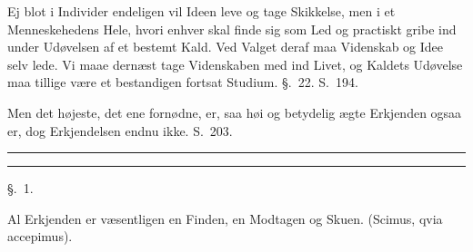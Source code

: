 \documentclass[12pt,a4paper]{book}
\newcommand{\apage}[1]{\marginnote{\footnotesize\textit{[#1]}}}
\begin{document}
Ej blot i Individer endeligen vil Ideen leve og tage Skikkelse, men i et
Menneskehedens Hele, hvori enhver skal finde sig som Led og practiskt gribe
ind under Udøvelsen af et bestemt Kald. Ved Valget deraf maa Videnskab og Idee
selv lede. Vi maae dernæst tage Videnskaben med ind Livet, og Kaldets
Udøvelse maa tillige være et bestandigen fortsat Studium. §.~22. S.~194.

Men det højeste, det ene fornødne, er, saa høi og betydelig ægte Erkjenden
ogsaa er, dog Erkjendelsen endnu ikke. S.~203.

\begin{center}\rule{0.28\linewidth}{0.4pt}\end{center}


\begin{center}\rule{0.28\linewidth}{0.4pt}\end{center}

\begin{center}\large\S.~1.\end{center} \apage{3} 

Al Erkjenden er væsentligen en Finden, en Modtagen og Skuen. (Scimus, qvia
accepimus).
\end{document}
